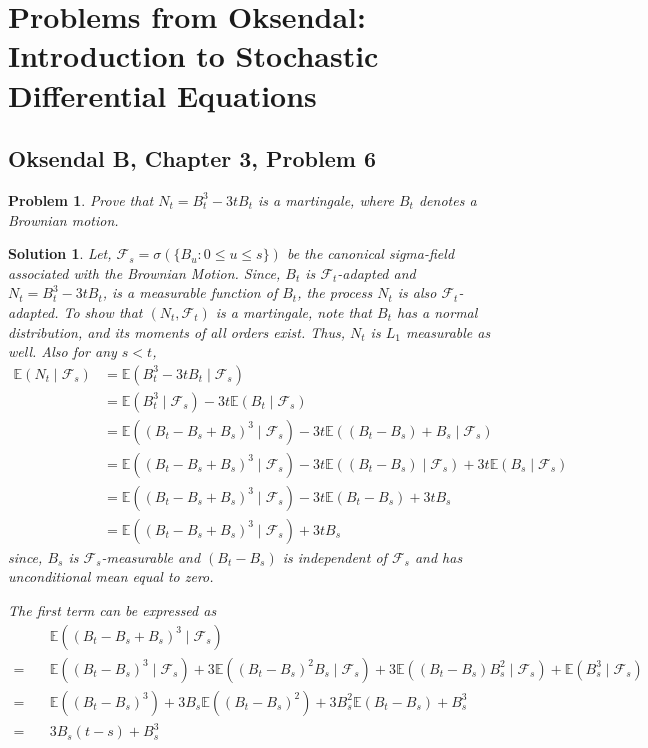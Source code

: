 \documentclass[12pt]{article}
\theoremstyle{problemstyle}
\newtheorem{pbm}{Problem}
\newtheorem*{solution*}{Solution}
\newenvironment{problem}{
\begin{tcolorbox}[colback=green!10!white,colframe=black!75!black, parbox = false]\begin{pbm} }{\end{pbm}\end{tcolorbox} }
\newcommand{\E}{\mathbb{E}}
\begin{document}
\newpage 


\section{Problems from Oksendal: Introduction to Stochastic Differential Equations}

\subsection{Oksendal B, Chapter 3, Problem 6}
\begin{problem}
Prove that $N_t = B_t^3 - 3 t B_t$ is a martingale, where $B_t$ denotes a Brownian motion.
\end{problem}
\begin{solution*}
Let, $\mathcal{F}_s = \sigma\left( \{ B_u : 0 \leq u \leq s \} \right)$ be the canonical sigma-field associated with the Brownian Motion. Since, $B_t$ is $\mathcal{F}_t$-adapted and $N_t = B_t^3 - 3 t B_t$, is a measurable function of $B_t$, the process $N_t$ is also $\mathcal{F}_t$-adapted. To show that $(N_t, \mathcal{F}_t)$ is a martingale, note that $B_t$ has a normal distribution, and its moments of all orders exist. Thus, $N_t$ is $L_1$ measurable as well. Also  for any $s < t$, 
\begin{align*}
    \E(N_t \mid \mathcal{F}_s)
    & = \E(B_t^3 - 3 t B_t \mid \mathcal{F}_s)\\
    & = \E(B_t^3 \mid \mathcal{F}_s) - 3 t \E(B_t \mid \mathcal{F}_s)\\
    & = \E((B_t - B_s + B_s)^3 \mid \mathcal{F}_s) - 3 t \E((B_t - B_s) + B_s \mid \mathcal{F}_s)\\
    & = \E((B_t - B_s + B_s)^3 \mid \mathcal{F}_s) - 3 t \E((B_t - B_s) \mid \mathcal{F}_s) + 3t \E(B_s \mid \mathcal{F}_s)\\
    & = \E((B_t - B_s + B_s)^3 \mid \mathcal{F}_s) - 3 t \E(B_t - B_s) + 3t B_s\\
    & = \E((B_t - B_s + B_s)^3 \mid \mathcal{F}_s) + 3t B_s
\end{align*}
\noindent since, $B_s$ is $\mathcal{F}_s$-measurable and $(B_t - B_s)$ is independent of $\mathcal{F}_s$ and has unconditional mean equal to zero.

The first term can be expressed as 
\begin{align*}
    & \E((B_t - B_s + B_s)^3 \mid \mathcal{F}_s)\\
    = \quad & \E((B_t - B_s)^3 \mid \mathcal{F}_s) + 3\E((B_t - B_s)^2 B_s \mid \mathcal{F}_s) + 3 \E((B_t - B_s) B_s^2 \mid \mathcal{F}_s) + \E(B_s^3 \mid \mathcal{F}_s)\\
    = \quad & \E((B_t - B_s)^3) + 3 B_s \E((B_t - B_s)^2) + 3B_s^2 \E(B_t - B_s) + B_s^3\\
    = \quad & 3 B_s(t-s) + B_s^3
\end{align*}


\end{solution*}
\end{document}
